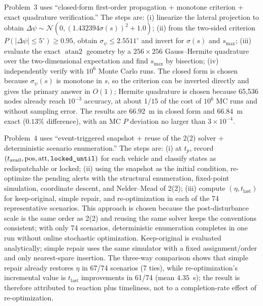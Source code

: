 Problem~3 uses ``closed-form first-order propagation + monotone criterion + exact quadrature verification.'' The steps are: (i) linearize the lateral projection to obtain $\Delta\psi\sim\mathcal{N}(0,(1.432394\sigma(s))^2+1.0)$; (ii) from the two-sided criterion $P(|\Delta\psi|\le5^\circ)\ge0.95$, obtain $\sigma_\psi\le2.5511^\circ$ and invert for $\sigma(s)$ and $s_{\max}$; (iii) evaluate the exact $\operatorname{atan2}$ geometry by a $256\times256$ Gauss--Hermite quadrature over the two-dimensional expectation and find $s_{\max}$ by bisection; (iv) independently verify with $10^6$ Monte Carlo runs. The closed form is chosen because $\sigma_\psi(s)$ is monotone in $s$, so the criterion can be inverted directly and gives the primary answer in $O(1)$; Hermite quadrature is chosen because 65,536 nodes already reach $10^{-3}$ accuracy, at about $1/15$ of the cost of $10^6$ MC runs and without sampling error. The results are $66.92$~m in closed form and $66.84$~m exact ($0.13\%$ difference), with an MC $P$ deviation no larger than $3\times10^{-4}$.

Problem~4 uses ``event-triggered snapshot + reuse of the 2(2) solver + deterministic scenario enumeration.'' The steps are: (i) at $t_p$, record $(t_{\mathrm{avail}},\mathrm{pos},\mathrm{att},\text{\texttt{locked\_until}})$ for each vehicle and classify states as redispatchable or locked; (ii) using the snapshot as the initial condition, re-optimize the pending alerts with the structural enumeration, fixed-point simulation, coordinate descent, and Nelder--Mead of 2(2); (iii) compute $(\eta,t_{\mathrm{last}})$ for keep-original, simple repair, and re-optimization in each of the 74 representative scenarios. This approach is chosen because the post-disturbance scale is the same order as 2(2) and reusing the same solver keeps the conventions consistent; with only 74 scenarios, deterministic enumeration completes in one run without online stochastic optimization. Keep-original is evaluated analytically; simple repair uses the same simulator with a fixed assignment/order and only nearest-spare insertion. The three-way comparison shows that simple repair already restores $\eta$ in 67/74 scenarios (7 ties), while re-optimization's incremental value is $t_{\mathrm{last}}$ improvements in 61/74 (mean $4.35$~s); the result is therefore attributed to reaction plus timeliness, not to a completion-rate effect of re-optimization.

